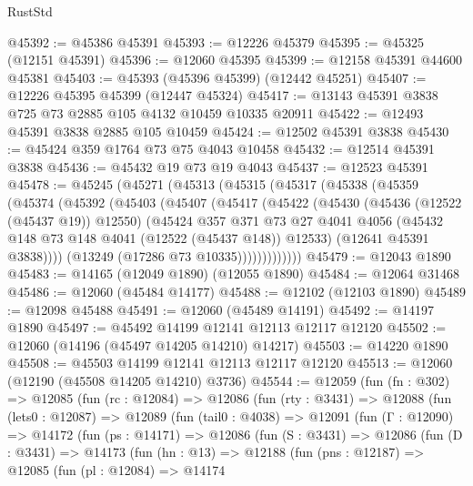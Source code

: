 \begin{lexlean}{RustStd}
\begin{coremodule}
@45392 := @45386 @45391
@45393 := @12226 @45379
@45395 := @45325 (@12151 @45391)
@45396 := @12060 @45395
@45399 := @12158 @45391 @44600 @45381
@45403 := @45393 (@45396 @45399) (@12442 @45251)
@45407 := @12226 @45395 @45399 (@12447 @45324)
@45417 := @13143 @45391 @3838 @725 @73 @2885 @105 @4132 @10459 @10335 @20911
@45422 := @12493 @45391 @3838 @2885 @105 @10459
@45424 := @12502 @45391 @3838
@45430 := @45424 @359 @1764 @73 @75 @4043 @10458
@45432 := @12514 @45391 @3838
@45436 := @45432 @19 @73 @19 @4043
@45437 := @12523 @45391
@45478 := @45245
    (@45271
      (@45313
        (@45315
          (@45317
            (@45338
              (@45359
                (@45374
                  (@45392
                    (@45403
                      (@45407
                        (@45417
                          (@45422
                            (@45430
                              (@45436 (@12522 (@45437 @19)) @12550)
                              (@45424
                                @357
                                @371
                                @73
                                @27
                                @4041
                                @4056
                                (@45432 @148 @73 @148 @4041 (@12522 (@45437 @148)) @12533)
                                (@12641 @45391 @3838))))
                          (@13249 (@17286 @73 @10335)))))))))))))
@45479 := @12043 @1890
@45483 := @14165 (@12049 @1890) (@12055 @1890)
@45484 := @12064 @31468
@45486 := @12060 (@45484 @14177)
@45488 := @12102 (@12103 @1890)
@45489 := @12098 @45488
@45491 := @12060 (@45489 @14191)
@45492 := @14197 @1890
@45497 := @45492 @14199 @12141 @12113 @12117 @12120
@45502 := @12060 (@14196 (@45497 @14205 @14210) @14217)
@45503 := @14220 @1890
@45508 := @45503 @14199 @12141 @12113 @12117 @12120
@45513 := @12060 (@12190 (@45508 @14205 @14210) @3736)
@45544 := @12059
    (fun (fn : @302) =>
    @12085
      (fun (rc : @12084) =>
      @12086
        (fun (rty : @3431) =>
        @12088
          (fun (lets0 : @12087) =>
          @12089
            (fun (tail0 : @4038) =>
            @12091
              (fun (Γ : @12090) =>
              @14172
                (fun (ps : @14171) =>
                @12086
                  (fun (S : @3431) =>
                  @12086
                    (fun (D : @3431) =>
                    @14173
                      (fun (hn : @13) =>
                      @12188
                        (fun (pns : @12187) =>
                        @12085
                          (fun (pl : @12084) =>
                          @14174

\end{coremodule}
\end{lexlean}
